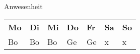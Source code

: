 ﻿%
\begin{table}[right]
    Anwesenheit
    \hfill
    \begin{tabular}{|l|l|l|l|l|l|l|}
    \textbf{Mo} & \textbf{Di} & \textbf{Mi} & \textbf{Do} & \textbf{Fr} &
\textbf{Sa} & \textbf{So} \\

    Bo    & Bo    & Bo    & Ge    & Ge    & x     & x \\
    \end{tabular}%
\end{table}%

